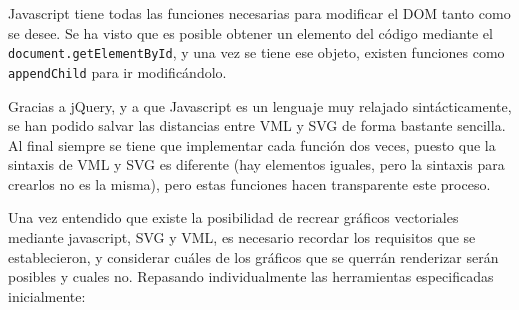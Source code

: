 Javascript tiene todas las funciones necesarias para modificar el DOM tanto como se desee. Se ha visto que es posible obtener un elemento del código mediante el \texttt{document.getElementById}, y una vez se tiene ese objeto, existen funciones como \texttt{appendChild} para ir modificándolo.

Gracias a jQuery, y a que Javascript es un lenguaje muy relajado sintácticamente, se han podido salvar las distancias entre VML y SVG de forma bastante sencilla. Al final siempre se tiene que implementar cada función dos veces, puesto que la sintaxis de VML y SVG es diferente (hay elementos iguales, pero la sintaxis para crearlos no es la misma), pero estas funciones hacen transparente este proceso. 

Una vez entendido que existe la posibilidad de recrear gráficos vectoriales mediante javascript, SVG y VML, es necesario recordar los requisitos que se establecieron, y considerar cuáles de los gráficos que se querrán renderizar serán posibles y cuales no. Repasando individualmente las herramientas especificadas inicialmente: 


